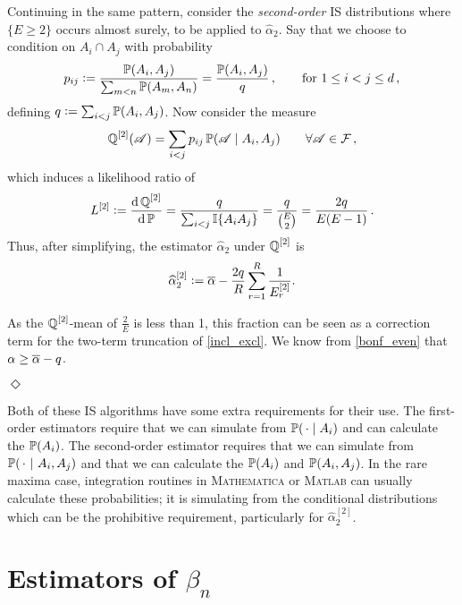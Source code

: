 Continuing in the same pattern, consider the \emph{second-order} IS distributions where $\{E \geq 2\}$ occurs almost surely, to be applied to $\hat{\alpha}_2$.
Say that we choose to condition on $A_i \cap A_j$ with probability
\[ p_{ij} := \frac{\operatorname{{\mathbb P}}(A_i,A_j)}{ \sum_{m<n} \operatorname{{\mathbb P}}(A_m,A_n) } = \frac{\operatorname{{\mathbb P}}(A_i,A_j)}{ q } \,,\qquad \text{for } 1 \le i < j \le d\,, \]
defining ${q}:= \sum_{i<j} \operatorname{{\mathbb P}}(A_i, A_j)$. Now consider the measure
\[ \operatorname{\mathbb Q}^{[2]}( \mathscr{A} ) = \sum_{i<j} p_{ij} \operatorname{{\mathbb P}}( \mathscr{A} \mid A_i, A_j)  \qquad \forall \mathscr{A} \in \mathcal{F} \,, \]
which induces a likelihood ratio of
\[ L^{[2]} := \frac{\mathrm{d} \operatorname{\mathbb Q}^{[2]} }{ \mathrm{d} \operatorname{{\mathbb P}} } = \frac{ {q} }{ \sum_{i<j} \mathbb I\{A_iA_j\}} 
  = \frac{ {q} }{ \binom{ E }{2} } = \frac{2 {q} }{ E (E - 1) }  \,. \]
Thus, after simplifying, the estimator $\hat{\alpha}_2$ under $\operatorname{\mathbb Q}^{[2]}$ is
\begin{align} \label{alpha_2_IS_2}
  \hat{\alpha}_{2}^{[2]} := 
  \alphaMax -  \frac{2q}{R} \sum_{r=1}^R \frac{1}{E_r^{[2]}} .%
\end{align}


\begin{Remark}
As the $\operatorname{\mathbb Q}^{[2]}$-mean of $\frac2{E}$ is less than 1, this fraction can be seen as a correction term for the two-term truncation of \eqref{incl_excl}. We know from \eqref{bonf_even} that $\alpha \ge \overline{\alpha} - q$. 

\hfill $\Diamond$
\end{Remark}

Both of these IS algorithms have some extra requirements for their use. The first-order estimators require 
that we can simulate from $\operatorname{{\mathbb P}}(\,\cdot \mid A_i)$ and can calculate the $\operatorname{{\mathbb P}}(A_i)$.
The second-order estimator requires that we 
can simulate from $\operatorname{{\mathbb P}}(\,\cdot~|~A_i, A_j)$ and that we can calculate the $\operatorname{{\mathbb P}}(A_i)$ and $\operatorname{{\mathbb P}}(A_i, A_j)$.
In the rare maxima case, integration routines in \textsc{Mathematica} or \textsc{Matlab} can usually calculate these probabilities; it is simulating from the conditional distributions which can be the prohibitive requirement, particularly for $\hat{\alpha}_{2}^{[2]}$. 

\section{Estimators of $\beta_n$} \label{scn:beta_ests}

